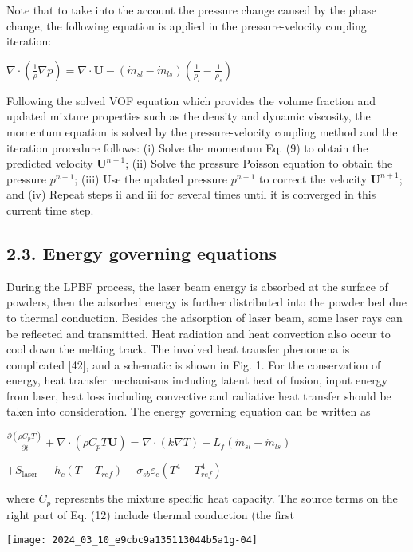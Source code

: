 \documentclass[10pt]{article}
\begin{document}
Note that to take into the account the pressure change caused by the phase change, the following equation is applied in the pressure-velocity coupling iteration:

$\nabla \cdot\left(\frac{1}{\rho} \nabla p\right)=\nabla \cdot \mathbf{U}-\left(\dot{m}_{s l}-\dot{m}_{l s}\right)\left(\frac{1}{\rho_{l}}-\frac{1}{\rho_{s}}\right)$

Following the solved VOF equation which provides the volume fraction and updated mixture properties such as the density and dynamic viscosity, the momentum equation is solved by the pressure-velocity coupling method and the iteration procedure follows: (i) Solve the momentum Eq. (9) to obtain the predicted velocity $\mathbf{U}^{n+1}$; (ii) Solve the pressure Poisson equation to obtain the pressure $p^{n+1}$; (iii) Use the updated pressure $p^{n+1}$ to correct the velocity $\mathbf{U}^{n+1}$; and (iv) Repeat steps ii and iii for several times until it is converged in this current time step.

\subsection*{2.3. Energy governing equations}
During the LPBF process, the laser beam energy is absorbed at the surface of powders, then the adsorbed energy is further distributed into the powder bed due to thermal conduction. Besides the adsorption of laser beam, some laser rays can be reflected and transmitted. Heat radiation and heat convection also occur to cool down the melting track. The involved heat transfer phenomena is complicated [42], and a schematic is shown in Fig. 1. For the conservation of energy, heat transfer mechanisms including latent heat of fusion, input energy from laser, heat loss including convective and radiative heat transfer should be taken into consideration. The energy governing equation can be written as

$\frac{\partial\left(\rho C_{p} T\right)}{\partial t}+\nabla \cdot\left(\rho C_{p} T \mathbf{U}\right)=\nabla \cdot(k \nabla T)-L_{f}\left(\dot{m}_{s l}-\dot{m}_{l s}\right)$

$+S_{\text {laser }}-h_{c}\left(T-T_{r e f}\right)-\sigma_{s b} \varepsilon_{e}\left(T^{4}-T_{r e f}^{4}\right)$

where $C_{p}$ represents the mixture specific heat capacity. The source terms on the right part of Eq. (12) include thermal conduction (the first

\begin{center}
\texttt{[image: 2024\_03\_10\_e9cbc9a135113044b5a1g-04]}
\end{center}
\end{document}

